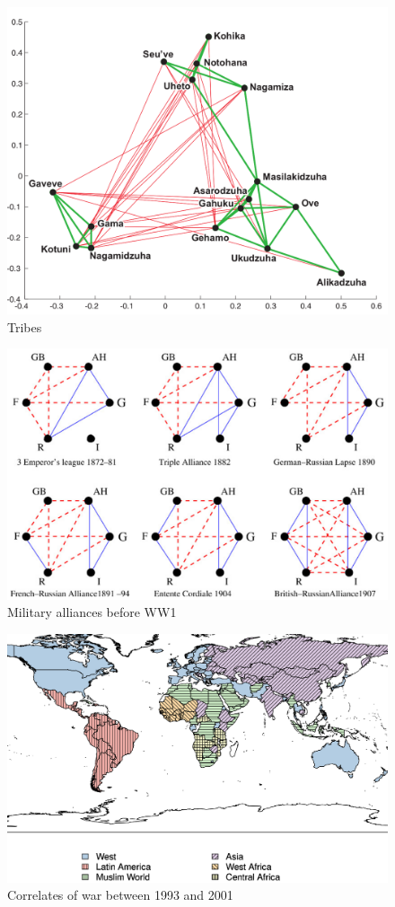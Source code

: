 \documentclass[xcolor=svgnames,slideopt,A4,handout]{beamer}
\begin{document}
\begin{frame}
	\begin{figure}[h]
		\centering
		\includegraphics[width=0.8\linewidth]{tribes.png}
		\caption{Tribes \autocite{Luca10}}
	\end{figure}
\end{frame}

\begin{frame}
	\begin{figure}[h]
		\centering
		\includegraphics[width=0.8\linewidth]{europe.png}
		\caption{Military alliances before WW1 \autocite{Antal2006a}}
	\end{figure}
\end{frame}

\begin{frame}
	\begin{figure}[h]
		\centering
		\includegraphics[width=0.8\linewidth]{world.png}
		\caption{Correlates of war between 1993 and 2001 \autocite{Traag2009}}
	\end{figure}
\end{frame}
\end{document}

